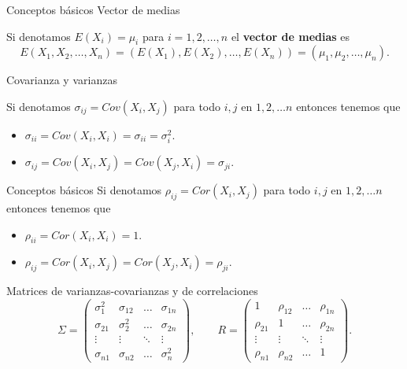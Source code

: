 \documentclass[
  ignorenonframetext,
]{beamer}
\providecommand{\tightlist}{%
  \setlength{\itemsep}{0pt}\setlength{\parskip}{0pt}}
\begin{document}
\begin{frame}{Conceptos básicos}
\protect\hypertarget{conceptos-buxe1sicos}{}
Vector de medias

Si denotamos \(E(X_i)=\mu_i\) para \(i=1,2,\ldots,n\) el \textbf{vector
de medias} es
\[E(X_1,X_2,\ldots,X_n)=(E(X_1),E(X_2),\ldots,E(X_n))=(\mu_1,\mu_2,\ldots,\mu_n).\]

Covarianza y varianzas

Si denotamos \(\sigma_{ij}=Cov(X_i,X_j)\) para todo \(i,j\) en
\(1,2,\ldots n\) entonces tenemos que

\begin{itemize}
\tightlist
\item
  \(\sigma_{ii}=Cov(X_i,X_i )=\sigma_{ii}=\sigma_{i} ^2.\)
\item
  \(\sigma_{ij}=Cov(X_i,X_j )=Cov(X_j,X_i)=\sigma_{ji}.\)
\end{itemize}
\end{frame}

\begin{frame}{Conceptos básicos}
\protect\hypertarget{conceptos-buxe1sicos-1}{}
Si denotamos \(\rho_{ij}=Cor(X_i,X_j)\) para todo \(i,j\) en
\(1,2,\ldots n\) entonces tenemos que

\begin{itemize}
\tightlist
\item
  \(\rho_{ii}=Cor(X_i,X_i)=1.\)
\item
  \(\rho_{ij}=Cor(X_i,X_j)=Cor(X_j,X_i)=\rho_{ji}.\)
\end{itemize}
\end{frame}

\begin{frame}{Matrices de varianzas-covarianzas y de correlaciones}
\protect\hypertarget{matrices-de-varianzas-covarianzas-y-de-correlaciones}{}
\[\Sigma=
\left(\begin{matrix}
\sigma_{1}^2 & \sigma_{12} & \ldots & \sigma_{1n}\\
 \sigma_{21} & \sigma_{2}^2 & \ldots & \sigma_{2n}\\
 \vdots & \vdots & \ddots& \vdots\\
 \sigma_{n1} & \sigma_{n2} & \ldots & \sigma_{n}^2
 \end{matrix}\right)
 , \qquad 
 R=\left(\begin{matrix}
 1 & \rho_{12} & \ldots & \rho_{1n}\\
 \rho_{21} & 1 & \ldots & \rho_{2n}\\
 \vdots & \vdots & \ddots& \vdots\\
 \rho_{n1} & \rho_{n2} & \ldots & 1
 \end{matrix}\right).
 \]
\end{frame}
\end{document}
